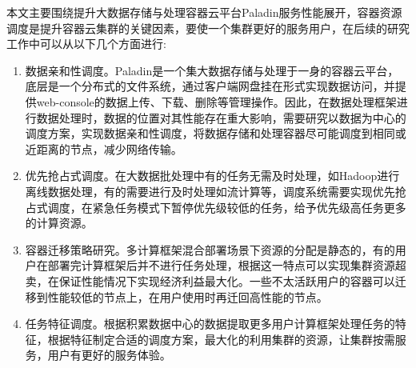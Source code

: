 本文主要围绕提升大数据存储与处理容器云平台Paladin服务性能展开，容器资源调度是提升容器云集群的关键因素，要使一个集群更好的服务用户，在后续的研究工作中可以从以下几个方面进行:
\begin{enumerate}[1.]
	\item 数据亲和性调度。Paladin是一个集大数据存储与处理于一身的容器云平台，底层是一个分布式的文件系统，通过客户端网盘挂在形式实现数据访问，并提供web-console的数据上传、下载、删除等管理操作。因此，在数据处理框架进行数据处理时，数据的位置对其性能存在重大影响，需要研究以数据为中心的调度方案，实现数据亲和性调度，将数据存储和处理容器尽可能调度到相同或近距离的节点，减少网络传输。
	\item 优先抢占式调度。在大数据批处理中有的任务无需及时处理，如Hadoop进行离线数据处理，有的需要进行及时处理如流计算等，调度系统需要实现优先抢占式调度，在紧急任务模式下暂停优先级较低的任务，给予优先级高任务更多的计算资源。
	\item 容器迁移策略研究。多计算框架混合部署场景下资源的分配是静态的，有的用户在部署完计算框架后并不进行任务处理，根据这一特点可以实现集群资源超卖，在保证性能情况下实现经济利益最大化。一些不太活跃用户的容器可以迁移到性能较低的节点上，在用户使用时再迁回高性能的节点。
	\item 任务特征调度。根据积累数据中心的数据提取更多用户计算框架处理任务的特征，根据特征制定合适的调度方案，最大化的利用集群的资源，让集群按需服务，用户有更好的服务体验。
\end{enumerate}